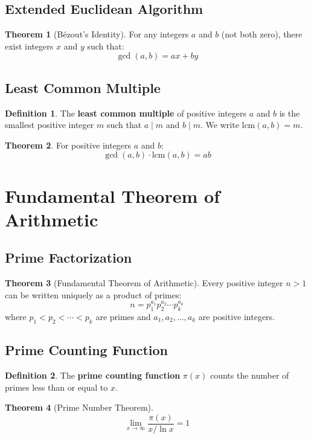 \documentclass[11pt]{article}
\theoremstyle{definition}
\newtheorem{definition}{Definition}[section]
\newtheorem{theorem}{Theorem}[section]
\begin{document}
\subsection{Extended Euclidean Algorithm}
\begin{theorem}[Bézout's Identity]
For any integers $a$ and $b$ (not both zero), there exist integers $x$ and $y$ such that:
$$\gcd(a,b) = ax + by$$
\end{theorem}

\subsection{Least Common Multiple}
\begin{definition}
The \textbf{least common multiple} of positive integers $a$ and $b$ is the smallest positive integer $m$ such that $a \mid m$ and $b \mid m$. We write $\text{lcm}(a,b) = m$.
\end{definition}

\begin{theorem}
For positive integers $a$ and $b$:
$$\gcd(a,b) \cdot \text{lcm}(a,b) = ab$$
\end{theorem}

\section{Fundamental Theorem of Arithmetic}

\subsection{Prime Factorization}
\begin{theorem}[Fundamental Theorem of Arithmetic]
Every positive integer $n > 1$ can be written uniquely as a product of primes:
$$n = p_1^{a_1} p_2^{a_2} \cdots p_k^{a_k}$$
where $p_1 < p_2 < \cdots < p_k$ are primes and $a_1, a_2, \ldots, a_k$ are positive integers.
\end{theorem}

\subsection{Prime Counting Function}
\begin{definition}
The \textbf{prime counting function} $\pi(x)$ counts the number of primes less than or equal to $x$.
\end{definition}

\begin{theorem}[Prime Number Theorem]
$$\lim_{x \to \infty} \frac{\pi(x)}{x/\ln x} = 1$$
\end{theorem}
\end{document}
